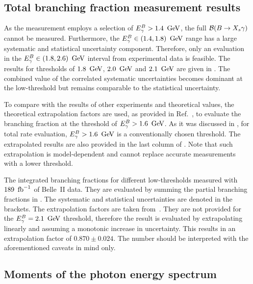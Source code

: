 \subsection{Total branching fraction measurement results}\label{sec:total_branching_fraction_results}

As the measurement employs a selection of ${E^B_{\gamma}}>1.4~\mathrm{\,Ge\kern -0.1em V}$, the full $\mathcal{B}(\BtoXsgamma)$ cannot be measured.
Furthermore, the ${E^B_{\gamma}}\in(1.4,1.8)~\mathrm{\,Ge\kern -0.1em V}$ range has a large systematic and statistical uncertainty component.
Therefore, only an evaluation in the ${E^B_{\gamma}}\in(1.8,2.6)~\mathrm{\,Ge\kern -0.1em V}$ interval from experimental data is feasible.
The results for thresholds of $1.8~\mathrm{\,Ge\kern -0.1em V}$, $2.0~\mathrm{\,Ge\kern -0.1em V}$ and $2.1~\mathrm{\,Ge\kern -0.1em V}$ are given in .
The combined value of the correlated systematic uncertainties becomes dominant at the low-\EB threshold but remains comparable to the statistical uncertainty.

To compare with the results of other experiments and theoretical values,
the theoretical extrapolation factors are used, as provided in Ref.~\cite{Buchmuller:2005zv},
to evaluate the branching fraction at the threshold of ${E^B_{\gamma}}>1.6~\mathrm{\,Ge\kern -0.1em V}$.
As it was discussed in , for \BtoXsgamma total rate evaluation, ${E^B_{\gamma}}>1.6~\mathrm{\,Ge\kern -0.1em V}$ is a conventionally chosen threshold.
The extrapolated results are also provided in the last column of .
Note that such extrapolation is model-dependent and cannot replace accurate measurements with a lower threshold.

\begin{table}[hbtp!]
    \centering
    \caption{\label{tab:integrated_branching_fractions}
    The integrated \BtoXsgamma branching fractions for different low-\EB thresholds measured with $189~\mbox{\,fb}^{-1}$ of Belle~II data.
    They are evaluated by summing the partial branching fractions in .
    The systematic and statistical uncertainties are denoted in the brackets.
    The extrapolation factors are taken from~\cite{Buchmuller:2005zv}.
    They are not provided for the ${E^B_{\gamma}}=2.1~\mathrm{\,Ge\kern -0.1em V}$ threshold,
    therefore the result is evaluated by extrapolating linearly and assuming a monotonic increase in uncertainty.
    This results in an extrapolation factor of $0.870\pm0.024$. 
    The number should be interpreted with the aforementioned caveats in mind only.
    }
    
\end{table}

\subsection{Moments of the \safeBtoXsgamma photon energy spectrum}\label{sec:spectrum_moments}

